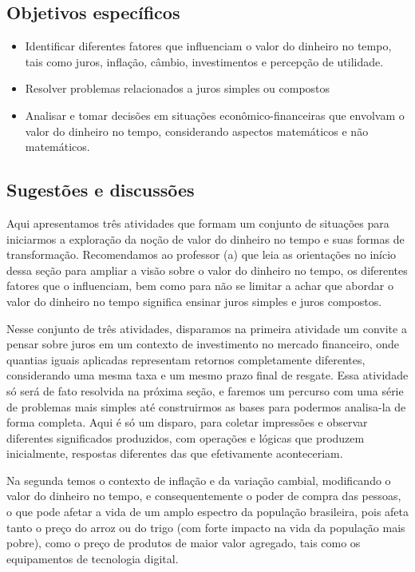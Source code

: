 \begin{texto}
{\def\currentcolor{session1}
\subsection{Objetivos específicos}
\begin{itemize}
\item Identificar diferentes fatores que influenciam o valor do dinheiro no tempo, tais como juros, inflação, câmbio, investimentos e percepção de utilidade.
\item Resolver problemas relacionados a juros simples ou compostos
\item Analisar e tomar decisões em situações econômico-financeiras que envolvam o valor do dinheiro no tempo, considerando aspectos matemáticos e não matemáticos.
\end{itemize}

\subsection{Sugestões e discussões}

Aqui apresentamos três atividades que formam um conjunto de situações para iniciarmos a exploração da noção de valor do dinheiro no tempo e suas formas de transformação.
Recomendamos ao professor (a) que leia as orientações no início dessa seção para ampliar a visão sobre o valor do dinheiro no tempo, os diferentes fatores que o influenciam, bem como para não se limitar a achar que abordar o valor do dinheiro no tempo significa ensinar juros simples e juros compostos. 

Nesse conjunto de três atividades, disparamos na primeira atividade um convite a pensar sobre juros em um contexto de investimento no mercado financeiro, onde quantias iguais aplicadas representam retornos completamente diferentes, considerando uma mesma taxa e um mesmo prazo final de resgate. Essa atividade só será de fato resolvida na próxima seção, e faremos um percurso com uma série de problemas mais simples até construirmos as bases para podermos analisa-la de forma completa. Aqui é só um disparo, para coletar impressões e observar diferentes significados produzidos, com operações e lógicas que produzem inicialmente, respostas diferentes das que efetivamente aconteceriam.

Na segunda temos o contexto de inflação e da variação cambial, modificando o valor do dinheiro no tempo, e consequentemente o poder de compra das pessoas, o que pode afetar a vida de um amplo espectro da população brasileira, pois afeta tanto o preço do arroz ou do trigo (com forte impacto na vida da população mais pobre), como o preço de produtos de maior valor agregado, tais como os equipamentos de tecnologia digital.

}
\end{texto}
